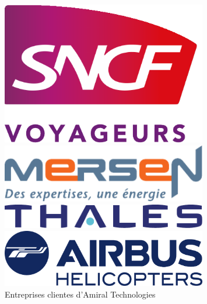 \begin{figure}[ht!]
    \begin{minipage}[c]{0.33\textwidth}
        \hspace{10px}\includegraphics[width=0.8\textwidth]{paper/figures/sncf.pdf}
    \end{minipage}
    \begin{minipage}[c]{0.5\textwidth}
        \hspace{10px}\includegraphics[width=0.8\textwidth]{paper/figures/mersen.pdf}
    \end{minipage}

    \begin{minipage}[c]{0.5\textwidth}
        \hspace{10px}\includegraphics[width=0.8\textwidth]{paper/figures/thales.pdf}
    \end{minipage}
    \begin{minipage}[c]{0.5\textwidth}
        \hspace{10px}\includegraphics[width=0.8\textwidth]{paper/figures/airbus.pdf}
    \end{minipage}
    \vspace{5px}
    \caption{Entreprises clientes d'Amiral Technologies}
    \label{fig:clients}
\end{figure}

